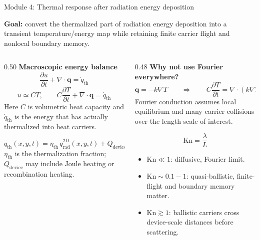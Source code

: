 \documentclass[aspectratio=169,9pt]{beamer}
\newcommand{\qvec}{\bm{q}}
\newcommand{\qrad}{\dot{q}_{\mathrm{rad}}}
\newcommand{\qth}{\dot{q}_{\mathrm{th}}}
\newcommand{\mfp}{\lambda}
\newcommand{\Kn}{\mathrm{Kn}}
\begin{document}
\begin{frame}{Module 4: Thermal response after radiation energy deposition}
\footnotesize
\vspace{-4mm}
\begin{bluebox}
\centering\small
\textbf{Goal:} convert the thermalized part of radiation energy deposition into a transient temperature/energy map while retaining finite carrier flight and nonlocal boundary memory.
\end{bluebox}

\vspace{1mm}
\begin{columns}[T,totalwidth=\textwidth]
\begin{column}{0.50\textwidth}
\textbf{Macroscopic energy balance}
\begin{equation*}
\boxed{\frac{\partial u}{\partial t}+\nabla\cdot\qvec=\qth}
\end{equation*}
\begin{equation*}
\boxed{u\simeq C T},\qquad
\boxed{C\frac{\partial T}{\partial t}+\nabla\cdot\qvec=\qth}
\end{equation*}
\small
Here \(C\) is volumetric heat capacity and \(\qth\) is the energy that has actually thermalized into heat carriers.

\vspace{1mm}
\begin{equation*}
\boxed{\qth(x,y,t)=\eta_{\mathrm{th}}\,\qrad^{2D}(x,y,t)+Q_{\mathrm{device}}}
\end{equation*}
\small
\(\eta_{\mathrm{th}}\) is the thermalization fraction; \(Q_{\mathrm{device}}\) may include Joule heating or recombination heating.
\end{column}

\begin{column}{0.48\textwidth}
\textbf{Why not use Fourier everywhere?}
\begin{equation*}
\boxed{\qvec=-k\nabla T}
\qquad\Rightarrow\qquad
\boxed{C\frac{\partial T}{\partial t}=\nabla\cdot(k\nabla T)+\qth}
\end{equation*}
\small
Fourier conduction assumes local equilibrium and many carrier collisions over the length scale of interest.

\vspace{1mm}
\begin{equation*}
\boxed{\Kn=\frac{\mfp}{L}}
\end{equation*}
\begin{itemize}\setlength\itemsep{0.25mm}
\item \(\Kn\ll 1\): diffusive, Fourier limit.
\item \(\Kn\sim 0.1-1\): quasi-ballistic, finite-flight and boundary memory matter.
\item \(\Kn\gtrsim 1\): ballistic carriers cross device-scale distances before scattering.
\end{itemize}
\end{column}
\end{columns}


\end{frame}
\end{document}
